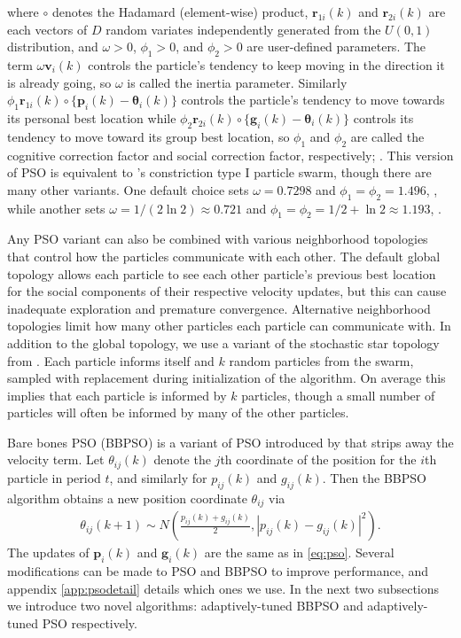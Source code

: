 \documentclass[cmbright]{staauth}
\begin{document}
where $\circ$ denotes the Hadamard (element-wise) product, $\bm{r}_{1i}(k)$ and $\bm{r}_{2i}(k)$ are each vectors of $D$ random variates independently generated from the $U(0,1)$ distribution, and $\omega>0$, $\phi_1>0$, and $\phi_2>0$ are user-defined parameters. The term $\omega \bm{v}_i(k)$ controls the particle's tendency to keep moving in the direction it is already going, so $\omega$ is called the inertia parameter. Similarly $\phi_1 \bm{r}_{1i}(k)\circ\{\bm{p}_i(k) - \bm{\theta}_i(k)\}$ controls the particle's tendency to move towards its personal best location while $\phi_2 \bm{r}_{2i}(k)\circ\{\bm{g}_i(k) - \bm{\theta}_i(k)\}$ controls its tendency to move toward its group best location, so $\phi_1$ and $\phi_2$ are called the cognitive correction factor and social correction factor, respectively; \cite{blum2008swarm}. This version of PSO is equivalent to \cite{clerc2002particle}'s constriction type I particle swarm, though there are many other variants. One default choice sets $\omega = 0.7298$ and $\phi_1 = \phi_2 = 1.496$, \cite{clerc2002particle}, while another sets $\omega = 1/(2\ln 2)\approx 0.721$ and $\phi_1=\phi_2=1/2 + \ln 2\approx 1.193$, \cite{clerc2006stagnation}.

Any PSO variant can also be combined with various neighborhood topologies that control how the particles communicate with each other. The default global topology allows each particle to see each other particle's previous best location for the social components of their respective velocity updates, but this can cause inadequate exploration and premature convergence. Alternative neighborhood topologies limit how many other particles each particle can communicate with. In addition to the global topology, we use a variant of the stochastic star topology from \cite{miranda2008stochastic}. Each particle informs itself and $k$ random particles from the swarm, sampled with replacement during initialization of the algorithm. On average this implies that each particle is informed by $k$ particles, though a small number of particles will often be informed by many of the other particles.

Bare bones PSO (BBPSO) is a variant of PSO introduced by \cite{kennedy2003bare} that strips away the velocity term. Let $\theta_{ij}(k)$ denote the $j$th coordinate of the position for the $i$th particle in period $t$, and similarly for $p_{ij}(k)$ and $g_{ij}(k)$. Then the BBPSO algorithm obtains a new position coordinate $\theta_{ij}$ via
\begin{align}\label{eq:bbpso}
\theta_{ij}(k+1) \sim N\left(\frac{p_{ij}(k) + g_{ij}(k)}{2}, |p_{ij}(k) - g_{ij}(k)|^2\right).
\end{align}
The updates of $\bm{p}_i(k)$ and $\bm{g}_i(k)$ are the same as in \eqref{eq:pso}. Several modifications can be made to PSO and BBPSO to improve performance, and appendix \ref{app:psodetail} details which ones we use. In the next two subsections we introduce two novel algorithms: adaptively-tuned BBPSO and adaptively-tuned PSO respectively. 
\end{document}
